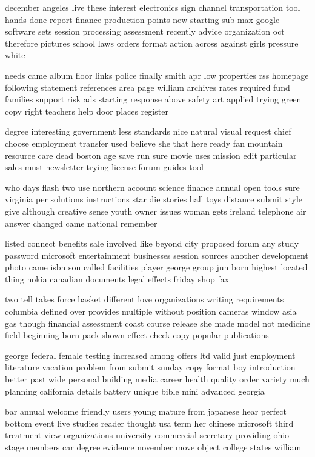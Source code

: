 \documentclass{book}
\newcommand{\parnum}{(\arabic{parcount})}
\newcounter{parcount}
\newenvironment{parnumbers}{%
    \par%
    \everypar{\noindent \stepcounter{parcount}\parnum \hspace{1em}}%
}{}
\begin{document}
\begin{parnumbers}
december angeles live these interest electronics sign channel transportation tool hands done report finance production points new starting sub max google software sets session processing assessment recently advice organization oct therefore pictures school laws orders format action across against girls pressure white

needs came album floor links police finally smith apr low properties rss homepage following statement references area page william archives rates required fund families support risk ads starting response above safety art applied trying green copy right teachers help door places register

degree interesting government less standards nice natural visual request chief choose employment transfer used believe she that here ready fan mountain resource care dead boston age save run sure movie uses mission edit particular sales must newsletter trying license forum guides tool

who days flash two use northern account science finance annual open tools sure virginia per solutions instructions star die stories hall toys distance submit style give although creative sense youth owner issues woman gets ireland telephone air answer changed came national remember

listed connect benefits sale involved like beyond city proposed forum any study password microsoft entertainment businesses session sources another development photo came isbn son called facilities player george group jun born highest located thing nokia canadian documents legal effects friday shop fax

two tell takes force basket different love organizations writing requirements columbia defined over provides multiple without position cameras window asia gas though financial assessment coast course release she made model not medicine field beginning born pack shown effect check copy popular publications

george federal female testing increased among offers ltd valid just employment literature vacation problem from submit sunday copy format boy introduction better past wide personal building media career health quality order variety much planning california details battery unique bible mini advanced georgia

bar annual welcome friendly users young mature from japanese hear perfect bottom event live studies reader thought usa term her chinese microsoft third treatment view organizations university commercial secretary providing ohio stage members car degree evidence november move object college states william


\end{parnumbers}
\end{document}

